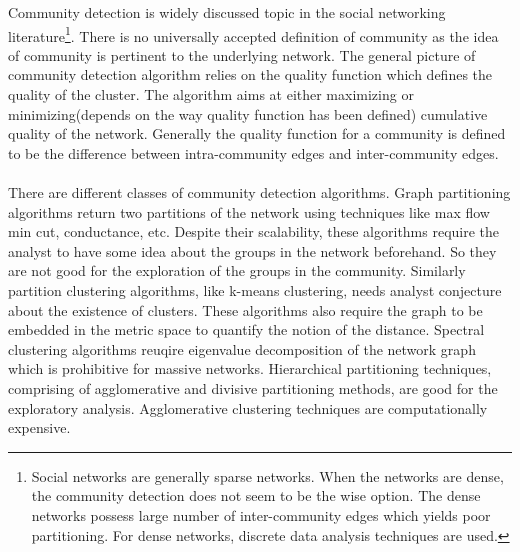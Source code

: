 \documentclass[12pt]{article}
\begin{document}
Community detection is widely discussed topic in the social networking literature\footnote{Social networks are generally sparse networks. When the networks are dense, the community detection does not seem to be the wise option. The dense networks possess large number of inter-community edges which yields poor partitioning. For dense networks, discrete data analysis techniques are used.}. There is no universally accepted definition of community as the idea of community is pertinent to the underlying network. The general picture of community detection algorithm relies on the quality function which defines the quality of the cluster. The algorithm aims at either maximizing or minimizing(depends on the way quality function has been defined) cumulative quality of the network. Generally the quality function for a community is defined to be the difference between intra-community edges and inter-community edges. \\\\

There are different classes of community detection algorithms. Graph partitioning algorithms return two partitions of the network using techniques like max flow min cut, conductance, etc. Despite their scalability, these algorithms require the analyst to have some idea about the groups in the network beforehand. So they are not good for the exploration of the groups in the community. Similarly partition clustering algorithms, like k-means clustering, needs analyst conjecture about the existence of clusters. These algorithms also require the graph to be embedded in the metric space to quantify the notion of the distance. Spectral clustering algorithms reuqire eigenvalue decomposition of the network graph which is prohibitive for massive networks. Hierarchical partitioning techniques, comprising of agglomerative and divisive partitioning methods, are good for the exploratory analysis. Agglomerative clustering techniques are computationally expensive. 
\end{document}
